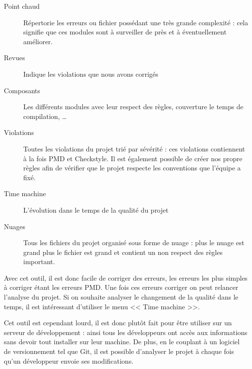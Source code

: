 \documentclass[12pt,a4paper,openany]{book}
\begin{document}
\begin{description}
	\item[Point chaud] Répertorie les erreurs ou fichier possédant une très grande complexité : cela signifie que ces modules sont à surveiller de près
		et à éventuellement améliorer.
	\item[Revues] Indique les violations que nous avons corrigés 
	\item[Composants] Les différents modules avec leur respect des règles, couverture le temps de compilation, \ldots
	\item[Violations] Toutes les violations du projet trié par sévérité : ces violations contiennent à la fois PMD et Checkstyle. Il est également
		possible de créer nos propre règles afin de vérifier que le projet respecte les conventions que l'équipe a fixé.
	\item[Time machine] L'évolution dans le temps de la qualité du projet
	\item[Nuages] Tous les fichiers du projet organisé sous forme de nuage : plus le nuage est grand plus le fichier est grand et contient un non
		respect des règles important.
\end{description}

Avec cet outil, il est donc facile de corriger des erreurs, les erreurs les plus simples à corriger étant les erreurs PMD. Une fois ces erreurs corriger
on peut relancer l'analyse du projet. Si on souhaite analyser le changement de la qualité dans le temps, il est intéressant d'utiliser le menu << Time
machine >>.

Cet outil est cependant lourd, il est donc plutôt fait pour être utiliser sur un serveur de développement : ainsi tous les développeurs ont accès aux
informations sans devoir tout installer sur leur machine. De plus, en le couplant à un logiciel de versionnement tel que Git, il est possible d'analyser
le projet à chaque fois qu'un développeur envoie ses modifications.
\end{document}
